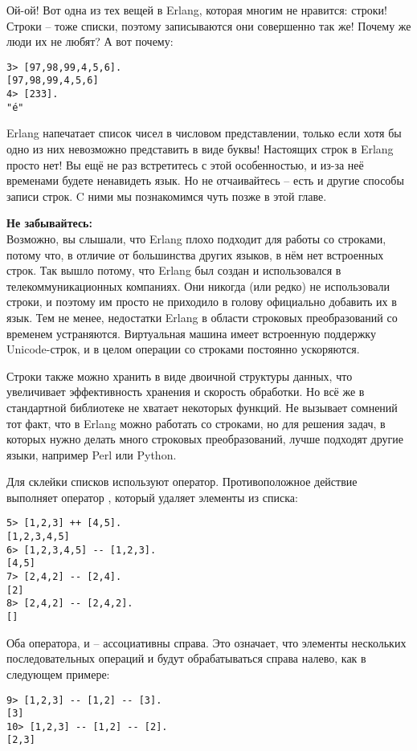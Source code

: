 Ой\--ой!
Вот одна из тех вещей в Erlang, которая многим не нравится: строки!
Строки \--- тоже списки, поэтому записываются они совершенно так же!
Почему же люди их не любят?
А вот почему:
\begin{lstlisting}[style=repl]
3> [97,98,99,4,5,6].
[97,98,99,4,5,6]
4> [233].
"é"
\end{lstlisting}

Erlang напечатает список чисел в числовом представлении, только если хотя бы одно из них невозможно представить в виде буквы!
Настоящих строк в Erlang просто нет!
Вы ещё не раз встретитесь с этой особенностью, и из\--за неё временами будете ненавидеть язык.
Но не отчаивайтесь \--- есть и другие способы записи строк.
C ними мы познакомимся чуть позже в этой главе.\\ 
\colorbox{lorange}
{
    \begin{minipage}{1.0\linewidth}
        \textbf{Не забывайтесь:}\\ 
        Возможно, вы слышали, что Erlang плохо подходит для работы со строками, потому что, в отличие от большинства других языков, в нём нет встроенных строк.
        Так вышло потому, что Erlang был создан и использовался в телекоммуникационных компаниях.
        Они никогда (или редко) не использовали строки, и поэтому им просто не приходило в голову официально добавить их в язык.
        Тем не менее, недостатки Erlang в области строковых преобразований со временем устраняются.
        Виртуальная машина имеет встроенную поддержку Unicode\--строк, и в целом операции со строками постоянно ускоряются.
        
        Строки также можно хранить в виде двоичной структуры данных, что увеличивает эффективность хранения и скорость обработки.
        Но всё же в стандартной библиотеке не хватает некоторых функций.
        Не вызывает сомнений тот факт, что в Erlang можно работать со строками, но для решения задач, в которых нужно делать много строковых преобразований, лучше подходят другие языки, например Perl или Python.
    \end{minipage}
}

Для склейки списков используют оператор\ops{++}.
Противоположное действие выполняет оператор \ops{$--$}, который удаляет элементы из списка:
\begin{lstlisting}[style=repl]
5> [1,2,3] ++ [4,5].
[1,2,3,4,5]
6> [1,2,3,4,5] -- [1,2,3].
[4,5]
7> [2,4,2] -- [2,4].
[2]
8> [2,4,2] -- [2,4,2].
[]
\end{lstlisting}

Оба оператора, \ops{++} и \ops{$--$} \--- ассоциативны справа.
Это означает, что элементы нескольких последовательных операций \ops{++} и \ops{$--$} будут обрабатываться справа налево, как в следующем примере:
\begin{lstlisting}[style=repl]
9> [1,2,3] -- [1,2] -- [3].
[3]
10> [1,2,3] -- [1,2] -- [2].
[2,3]
\end{lstlisting}

